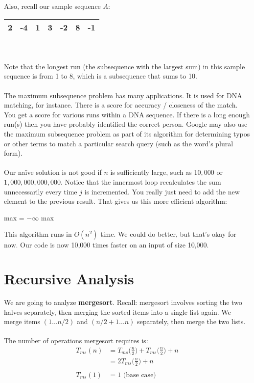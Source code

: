 \documentclass[]{article}
\theoremstyle{definition}
\begin{document}
			Also, recall our sample sequence $A$:
			\begin{tabular}{|c|c|c|c|c|c|c|}
				\hline 2 & -4 & 1 & 3 & -2 & 8 & -1 \\ \hline
			\end{tabular}
			\\ \\	
			Note that the longest run (the subsequence with the largest sum) in this sample sequence is from 1 to 8, which is a subsequence that sums to 10.
			\\ \\
			The maximum subsequence problem has many applications. It is used for DNA matching, for instance. There is a score for accuracy / closeness of the match. You get a score for various runs within a DNA sequence. If there is a long enough run(s) then you have probably identified the correct person. Google may also use the maximum subsequence problem as part of its algorithm for determining typos or other terms to match a particular search query (such as the word's plural form).
			\\ \\
			Our na\"ive solution is not good if $n$ is sufficiently large, such as $10,000$ or $1,000,000,000,000$. Notice that the innermost loop recalculates the sum unnecessarily every time $j$ is incremented. You really just need to add the new element to the previous result. That gives us this more efficient algorithm: \\
			\begin{algorithm}[H]
				max = $-\infty$\;
				\Return max
			\end{algorithm}

			This algorithm runs in $O(n^2)$ time. We could do better, but that's okay for now. Our code is now 10,000 times faster on an input of size 10,000.
	\section{Recursive Analysis}
		We are going to analyze \textbf{mergesort}. Recall: mergesort involves sorting the two halves separately, then merging the sorted items into a single list again. We merge items $(1 \ldots n/2)$ and $(n/2 + 1 \ldots n)$ separately, then merge the two lists.
		\\ \\
		The number of operations mergesort requires is:
		\begin{align*}
			T_{ms}(n) &= T_{ms}\big( \frac{n}{2} \big) + T_{ms}\big( \frac{n}{2} \big) + n \\
			&= 2T_{ms}\big( \frac{n}{2} \big) + n
			\\ \\
			T_{ms}(1) &= 1 \text{ (base case)}
		\end{align*}
		
\end{document}
